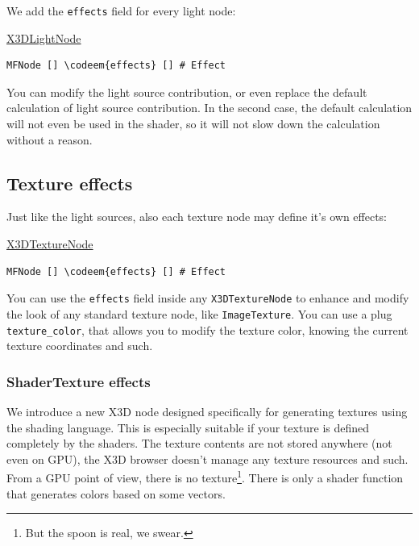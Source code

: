 \documentclass{acmsiggraph}                     %
\newenvironment{mycode}
{\begin{mycodecore}}
{\end{mycodecore}
\vspace{-0.1in}}
\newcommand*{\codeem}[1]{\textbf{#1}}
\begin{document}
We add the \texttt{effects} field for every light node:

\begin{mycode}
\underline{X3DLightNode}
\begin{Verbatim}[commandchars=\\\{\}]
MFNode [] \codeem{effects} [] # Effect
\end{Verbatim}
\end{mycode}

You can modify the light source contribution, or even replace the default
calculation of light source contribution. In the second case,
the default calculation will not even be used in the shader,
so it will not slow down the calculation without a reason.

\subsection{Texture effects}

Just like the light sources, also each texture node may define it's own effects:

\begin{mycode}
\underline{X3DTextureNode}
\begin{Verbatim}[commandchars=\\\{\}]
MFNode [] \codeem{effects} [] # Effect
\end{Verbatim}
\end{mycode}

You can use the \texttt{effects} field
inside any \texttt{X3DTextureNode} to enhance and modify the look of any
standard texture node, like \texttt{ImageTexture}.
You can use a plug \texttt{texture\_color},
that allows you to modify the texture color, knowing the current texture
coordinates and such.

\subsubsection{ShaderTexture effects}

We introduce a new X3D node designed specifically for generating
textures using the shading language. This is especially suitable
if your texture is defined completely by the shaders.
The texture contents are not stored anywhere (not even on GPU),
the X3D browser doesn't manage any texture resources and such.
From a GPU point of view, there is no texture\footnote{But the spoon is real,
we swear.}. There is only a shader function that generates colors
based on some vectors.
\end{document}
